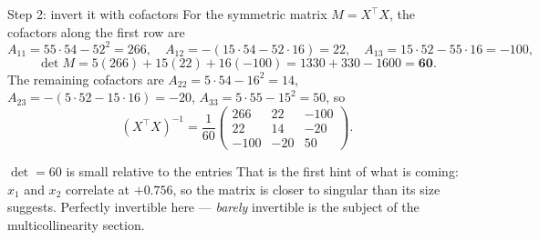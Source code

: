 \documentclass[aspectratio=169]{beamer}
\newcommand{\Xt}{X^{\!\top}}
\begin{document}
\begin{frame}[shrink=8]{Step 2: invert it with cofactors}
  For the symmetric matrix $M = \Xt X$, the cofactors along the first row are
  \[
    A_{11} = 55\cdot54 - 52^2 = 266,\quad
    A_{12} = -(15\cdot54 - 52\cdot16) = 22,\quad
    A_{13} = 15\cdot52 - 55\cdot16 = -100,
  \]
  \[
    \det M = 5(266) + 15(22) + 16(-100) = 1330 + 330 - 1600 = \mathbf{60}.
  \]
  The remaining cofactors are $A_{22} = 5\cdot54-16^2 = 14$,
  $A_{23} = -(5\cdot52-15\cdot16) = -20$, $A_{33} = 5\cdot55-15^2 = 50$, so
  \[
    (\Xt X)^{-1} = \frac{1}{60}
    \begin{pmatrix} 266 & 22 & -100\\ 22 & 14 & -20\\ -100 & -20 & 50
    \end{pmatrix}.
  \]
  \begin{alertblock}{$\det = 60$ is small relative to the entries}
    \small That is the first hint of what is coming: $x_1$ and $x_2$
    correlate at $+0.756$, so the matrix is closer to singular than its size
    suggests. Perfectly invertible here --- \emph{barely} invertible is the
    subject of the multicollinearity section.
  \end{alertblock}
\end{frame}
\end{document}
